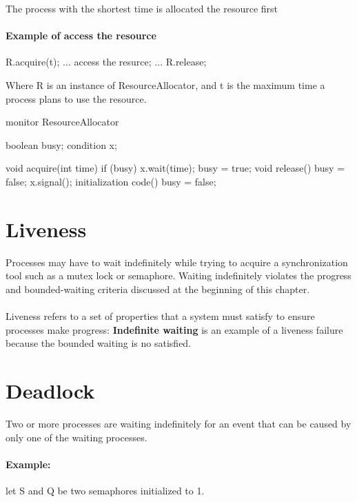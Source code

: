 The process with the shortest time is allocated the resource first

\paragraph{Example of access the resource}

\begin{codeInC}
R.acquire(t);
    ...
    access the resurce;
    ...
R.release;
\end{codeInC}

Where R is an instance of ResourceAllocator, and t is the maximum time a process plans to use the resource.


\begin{codeInC}
monitor ResourceAllocator{
    boolean busy;
    condition x;
    
    void acquire(int time) {
        if (busy)
            x.wait(time);
        busy = true;
    }
    void release() {
        busy = false;
        x.signal();
    }
    initialization code() {
        busy = false;
    }
}
\end{codeInC}

\newpage
\section{Liveness}
Processes may have to wait indefinitely while trying to acquire a synchronization tool such as a mutex lock or semaphore. Waiting indefinitely violates the progress and bounded-waiting criteria discussed at the beginning of this chapter.

\paragraph{}
Liveness refers to a set of properties that a system must satisfy to ensure processes make progress: \textbf{Indefinite waiting} is an example of a liveness failure because the bounded waiting is no satisfied.

\section{Deadlock}
Two or more processes are waiting indefinitely for an event that can be caused by only one of the waiting processes.

\paragraph{Example: } let S and Q be two semaphores initialized to 1.


